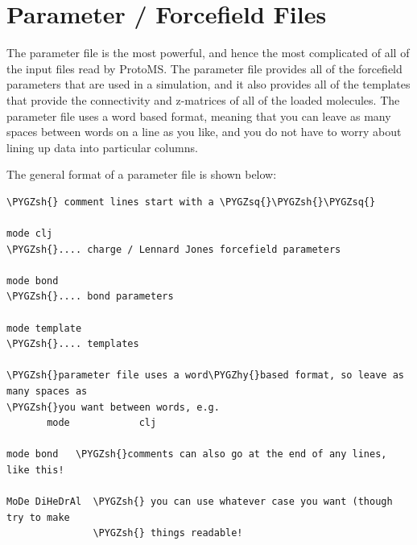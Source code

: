 \documentclass[letterpaper,10pt,english]{sphinxmanual}
\def\PYGZsh{\char`\#}
\def\PYGZhy{\char`\-}
\def\PYGZsq{\char`\'}
\renewcommand\PYGZsq{\textquotesingle}
\begin{document}
\section{Parameter / Forcefield Files}
\label{protoms:parfil}\label{protoms:parameter-forcefield-files}
The parameter file is the most powerful, and hence the most complicated of all of the input files read by ProtoMS. The parameter file provides all of the forcefield parameters that are used in a simulation, and it also provides all of the templates that provide the connectivity and z-matrices of all of the loaded molecules. The parameter file uses a word based format, meaning that you can leave as many spaces between words on a line as you like, and you do not have to worry about lining up data into particular columns.

The general format of a parameter file is shown below:

\begin{Verbatim}[frame=single,commandchars=\\\{\}]
\PYGZsh{} comment lines start with a \PYGZsq{}\PYGZsh{}\PYGZsq{}

mode clj
\PYGZsh{}.... charge / Lennard Jones forcefield parameters

mode bond
\PYGZsh{}.... bond parameters

mode template
\PYGZsh{}.... templates

\PYGZsh{}parameter file uses a word\PYGZhy{}based format, so leave as many spaces as
\PYGZsh{}you want between words, e.g.
       mode            clj

mode bond   \PYGZsh{}comments can also go at the end of any lines, like this!

MoDe DiHeDrAl  \PYGZsh{} you can use whatever case you want (though try to make
               \PYGZsh{} things readable!
\end{Verbatim}
\end{document}
